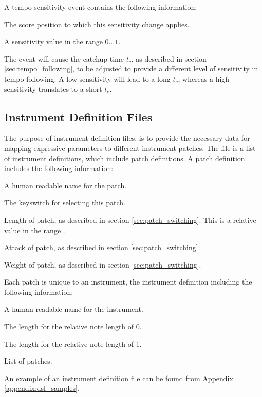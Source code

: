 A tempo sensitivity event contains the following information:
\begin{description}[leftmargin=16ex]
\item[Position] The score position to which this sensitivity change applies.
\item[Sensitivity] A sensitivity value in the range $0 \ldots 1$.
\end{description}
The event will cause the catchup time $t_c$,
as described in section \ref{sec:tempo_following},
to be adjusted to provide a different level of sensitivity in tempo following.
A low sensitivity will lead to a long $t_c$,
whereas a high sensitivity translates to a short $t_c$.


\subsection{Instrument Definition Files}
\label{sec:instrument_definition_format}

The purpose of instrument definition files,
is to provide the necessary data for
mapping expressive parameters to different
instrument patches.
The file is a list of instrument definitions,
which include patch definitions.
A patch definition includes the following information:
\begin{description}[leftmargin=24ex]
\item[Name] A human readable name for the patch.
\item[Keyswitch] The keyswitch for selecting this patch.
\item[Length] Length of patch, as described in section \ref{sec:patch_switching}.
This is a relative value in the range .
\item[Attack] Attack of patch, as described in section \ref{sec:patch_switching}.
\item[Weight] Weight of patch, as described in section \ref{sec:patch_switching}.
\end{description}
Each patch is unique to an instrument,
the instrument definition including the following information:
\begin{description}[leftmargin=24ex]
\item[Name] A human readable name for the instrument.
\item[Shortest note] The length for the relative note length of 0.
\item[Longest note] The length for the relative note length of 1.
\item[Patches] List of patches.
\end{description}
An example of an instrument definition file can be found from Appendix
\ref{appendix:dsl_samples}.

